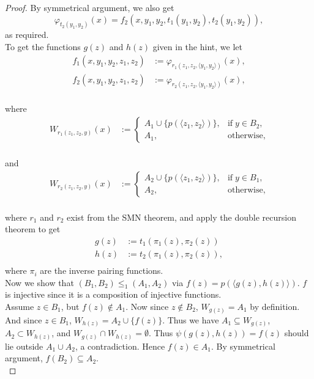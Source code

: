 \documentclass{article}
\begin{document}
\begin{enumerate}[label={\bf Q\arabic*:}]
\begin{proof}
      By symmetrical argument, we also get
      \[\varphi_{t_2(y_1,y_2)}(x) =f_2(x,y_1,y_2,t_1(y_1,y_2),t_2(y_1,y_2)),\]
      as required. \\

      To get the functions $g(z)$ and $h(z)$ given in the hint, we let
      \begin{align*}
        f_1(x,y_1,y_2,z_1,z_2) &:=\varphi_{r_1(z_1,z_2,\langle
          y_1,y_2\rangle)}(x),\\
        f_2(x,y_1,y_2,z_1,z_2) &:=\varphi_{r_2(z_1,z_2,\langle
          y_1,y_2\rangle)}(x),\\
      \end{align*}

      where
      \begin{align*}
        W_{r_1(z_1,z_2,y)}(x) &:=
        \begin{cases}
          A_1\cup\{p(\langle z_1,z_2\rangle)\}, &\text{if}\; y\in B_2,\\
          A_1, &\text{otherwise},
        \end{cases}\\
      \end{align*}

      and
      \begin{align*}
        W_{r_2(z_1,z_2,y)}(x) &:=
        \begin{cases}
          A_2\cup\{p(\langle z_1,z_2\rangle)\}, &\text{if}\; y\in B_1,\\
          A_2, &\text{otherwise},
        \end{cases}\\
      \end{align*}

      where $r_1$ and $r_2$ exist from the SMN theorem, and apply the
      double recursion theorem to get
      \begin{align*}
        g(z) &:= t_1(\pi_1(z),\pi_2(z))\\
        h(z) &:= t_2(\pi_1(z),\pi_2(z)),\\
      \end{align*}
      where $\pi_i$ are the inverse pairing functions. \\

      Now we show that $(B_1,B_2)\leq_1(A_1,A_2)$ via $f(z)=p(\langle
      g(z),h(z)\rangle)$. $f$ is injective since it is a composition of
      injective functions.\\

      Assume $z\in B_1$, but $f(z)\not\in A_1$. Now
      since $z\not\in B_2$, $W_{g(z)}=A_1$ by definition. And since $z\in
      B_1$, $W_{h(z)}=A_2\cup\{f(z)\}$. Thus we have $A_1\subseteq
      W_{g(z)}$, $A_2\subset W_{h(z)}$, and $W_{g(z)}\cap
      W_{h(z)}=\emptyset$. Thus $\psi(g(z),h(z))=f(z)$ should lie outside
      $A_1\cup A_2$, a contradiction. Hence $f(z)\in A_1$. By symmetrical
      argument, $f(B_2)\subseteq A_2$. \\


\end{proof}
\end{enumerate}
\end{document}
